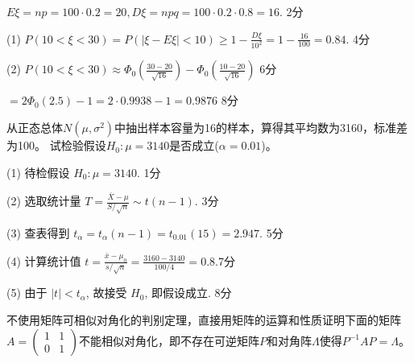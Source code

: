 \documentclass[noanswer]{USTBExam}
\begin{document}
\bigskip

\begin{solution}
  $E\xi = n p = 100 \cdot 0.2 = 20, D\xi = n p q = 100 \cdot 0.2 \cdot 0.8 = 16$. \dotfill 2分 \par
    (1) $P (10 < \xi < 30) = P (| \xi - E \xi | < 10) \geq 1 - \frac{D\xi}{10^2}
    = 1 - \frac{16}{100} = 0.84$. \dotfill 4分 \par
    (2) $P (10 < \xi < 30) \approx \Phi_0 \left( \frac{30 - 20}{\sqrt{16}}\right)
    - \Phi_0 \left( \frac{10 - 20}{\sqrt{16}} \right)$ \dotfill 6分\par
  \qquad $= 2 \Phi_0 (2.5) - 1 = 2 \cdot 0.9938 - 1 =0.9876$ \dotfill 8分
\end{solution}


\begin{problem}
  从正态总体$N(\mu,\sigma^2)$中抽出样本容量为16的样本，算得其平均数为3160，标准差为100。
  试检验假设$H_0:\mu=3140$是否成立($\alpha = 0.01$)。
\end{problem}

\bigskip

\begin{solution}
  (1) 待检假设 $H_0 : \mu = 3140$. \dotfill 1分\par
    (2) 选取统计量 $T = \frac{\bar{X}-\mu}{S / \sqrt{n}} \sim t(n-1)$. \dotfill 3分 \par
    (3) 查表得到 $t_{\alpha} = t_{\alpha} (n - 1) = t_{0.01} (15) =2.947$. \dotfill 5分 \par
    (4) 计算统计值 $t = \frac{\bar{x} - \mu_0}{s/\sqrt{n}} =\frac{3160-3140}{100/4} = 0.8$.\dotfill 7分 \par
    (5) 由于 $| t | < t_{\alpha}$, 故接受 $H_0$, 即假设成立. \dotfill 8分
\end{solution}




\begin{problem}
  不使用矩阵可相似对角化的判别定理，直接用矩阵的运算和性质证明下面的矩阵$A
    =\left(
      \begin{array}{cc}
          1 & 1 \\
          0 & 1
        \end{array}
      \right)$不能相似对角化，即不存在可逆矩阵$P$和对角阵$\Lambda$使得$P^{-1}AP=\Lambda$。
\end{problem}
\end{document}

